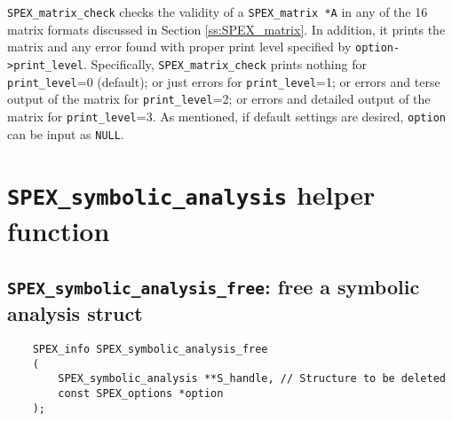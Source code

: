\documentclass[12pt,oneside]{book}
\theoremstyle{definition}
\begin{document}
\verb|SPEX_matrix_check| checks the validity of a \verb|SPEX_matrix *A| in any
of the 16 matrix formats discussed in Section \ref{ss:SPEX_matrix}.
In addition, it prints the matrix and any error found with proper print level specified by
\verb|option->print_level|. Specifically, \verb|SPEX_matrix_check| prints nothing for \verb|print_level|=0 (default); or just errors for \verb|print_level|=1; or errors and terse output of the matrix for \verb|print_level|=2; or errors and detailed output of the matrix for \verb|print_level|=3.
As mentioned, if default settings are desired, \verb|option| can be input as \verb|NULL|. 


\section{\texttt{SPEX\_symbolic\_analysis} helper function} \label{s:spex_symbolic_analysis_helper}

\subsection{\texttt{SPEX\_symbolic\_analysis\_free}: free a symbolic analysis struct}
\begin{mdframed}[userdefinedwidth=\textwidth]
{\footnotesize
\begin{verbatim}
    SPEX_info SPEX_symbolic_analysis_free
    (
        SPEX_symbolic_analysis **S_handle, // Structure to be deleted
        const SPEX_options *option
    ); 
\end{verbatim}
} \end{mdframed}
\end{document}
